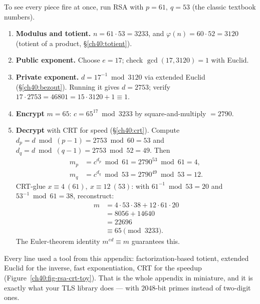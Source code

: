 To see every piece fire at once, run RSA with $p=61,\ q=53$ (the classic textbook numbers).

\begin{enumerate}
\item \textbf{Modulus and totient.} $n = 61\cdot 53 = 3233$, and $\varphi(n) = 60\cdot 52 = 3120$
      (totient of a product, \S\ref{ch40:totient}).
\item \textbf{Public exponent.} Choose $e = 17$; check $\gcd(17,3120)=1$ with Euclid.
\item \textbf{Private exponent.} $d = 17^{-1}\bmod 3120$ via extended Euclid (\S\ref{ch40:bezout}).
      Running it gives $d = 2753$; verify $17\cdot 2753 = 46801 = 15\cdot 3120 + 1\equiv 1$.
\item \textbf{Encrypt} $m = 65$: $c = 65^{17}\bmod 3233$ by square-and-multiply $= 2790$.
\item \textbf{Decrypt} with CRT for speed (\S\ref{ch40:crt}). Compute
      $d_p = d\bmod (p-1) = 2753\bmod 60 = 53$ and $d_q = d\bmod(q-1) = 2753\bmod 52 = 49$. Then
      \begin{align*}
        m_p &= c^{d_p}\bmod 61 = 2790^{53}\bmod 61 = 4, \\
        m_q &= c^{d_q}\bmod 53 = 2790^{49}\bmod 53 = 12.
      \end{align*}
      CRT-glue $x\equiv 4\ (61),\ x\equiv 12\ (53)$: with $61^{-1}\bmod 53 = 20$ and $53^{-1}\bmod
      61 = 38$, reconstruct:
      \begin{align*}
        m &= 4\cdot 53\cdot 38 + 12\cdot 61\cdot 20 \\
          &= 8056 + 14640 \\
          &= 22696 \\
          &\equiv 65 \pmod{3233}.
      \end{align*}
      The Euler-theorem identity $m^{ed}\equiv m$ guarantees this.
\end{enumerate}

Every line used a tool from this appendix: factorization-based totient, extended Euclid for the
inverse, fast exponentiation, CRT for the speedup (Figure~\ref{ch40:fig-rsa-crt-toy}). That is the whole appendix in miniature, and it is
exactly what your TLS library does --- with $2048$-bit primes instead of two-digit ones.

